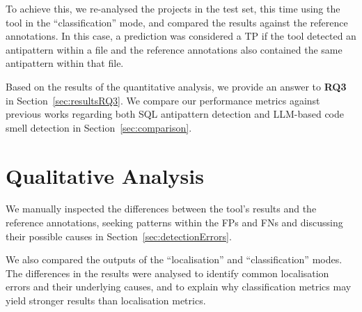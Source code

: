 To achieve this, we re-analysed the projects in the test set, this time using the tool in the “classification” mode, and compared the results against the reference annotations. In this case, a prediction was considered a TP if the tool detected an antipattern within a file and the reference annotations also contained the same antipattern within that file.

Based on the results of the quantitative analysis, we provide an answer to \textbf{RQ3} in Section~\ref{sec:resultsRQ3}. We compare our performance metrics against previous works regarding both SQL antipattern detection and LLM-based code smell detection in Section~\ref{sec:comparison}.

\section{Qualitative Analysis}

We manually inspected the differences between the tool's results and the reference annotations, seeking patterns within the FPs and FNs and discussing their possible causes in Section~\ref{sec:detectionErrors}.

We also compared the outputs of the “localisation” and “classification” modes. The differences in the results were analysed to identify common localisation errors and their underlying causes, and to explain why classification metrics may yield stronger results than localisation metrics.
